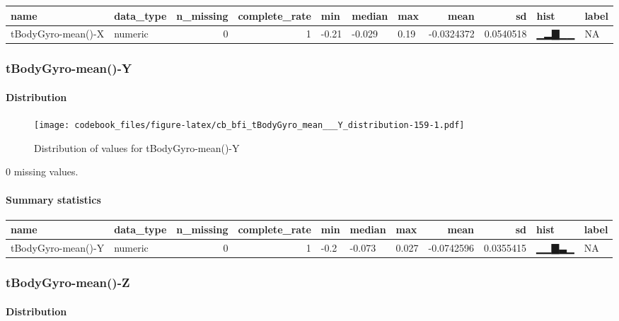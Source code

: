 \documentclass[
]{article}
\begin{document}
\begin{longtable}[]{@{}llrrlllrrll@{}}
\toprule
name & data\_type & n\_missing & complete\_rate & min & median & max &
mean & sd & hist & label \\
\midrule
\endhead
tBodyGyro-mean()-X & numeric & 0 & 1 & -0.21 & -0.029 & 0.19 &
-0.0324372 & 0.0540518 & ▁▂▇▁▁ & NA \\
\bottomrule
\end{longtable}

\hypertarget{tBodyGyro_mean___Y}{%
\subsubsection{tBodyGyro-mean()-Y}\label{tBodyGyro_mean___Y}}

\hypertarget{tBodyGyro_mean___Y_distribution}{%
\paragraph{Distribution}\label{tBodyGyro_mean___Y_distribution}}

\begin{figure}
\centering
\texttt{[image: codebook\_files/figure-latex/cb\_bfi\_tBodyGyro\_mean\_\_\_Y\_distribution-159-1.pdf]}
\caption{Distribution of values for tBodyGyro-mean()-Y}
\end{figure}

0 missing values.

\hypertarget{tBodyGyro_mean___Y_summary}{%
\paragraph{Summary statistics}\label{tBodyGyro_mean___Y_summary}}

\begin{longtable}[]{@{}llrrlllrrll@{}}
\toprule
name & data\_type & n\_missing & complete\_rate & min & median & max &
mean & sd & hist & label \\
\midrule
\endhead
tBodyGyro-mean()-Y & numeric & 0 & 1 & -0.2 & -0.073 & 0.027 &
-0.0742596 & 0.0355415 & ▁▁▇▃▁ & NA \\
\bottomrule
\end{longtable}

\hypertarget{tBodyGyro_mean___Z}{%
\subsubsection{tBodyGyro-mean()-Z}\label{tBodyGyro_mean___Z}}

\hypertarget{tBodyGyro_mean___Z_distribution}{%
\paragraph{Distribution}\label{tBodyGyro_mean___Z_distribution}}
\end{document}
